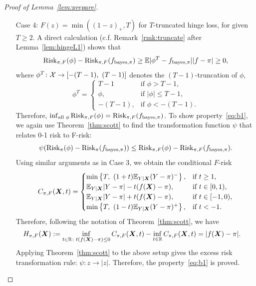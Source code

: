 \documentclass[11pt]{article}
\theoremstyle{plain}
\theoremstyle{definition}
\def\bayespif{f_{\textup{bayes},\pi}}
\def\risk{\textup{Risk}_\pi}
\def\riskF{\textup{Risk}_{\pi,F}}
\begin{document}
\begin{proof}[Proof of Lemma~\ref{lem:prepare}]
\begin{enumerate}[label={2.\arabic*},wide, labelwidth=!, labelindent=0pt]
\item[Case 4:] $F(z)=\min((1-z)_+,T)$ for $T$-truncated hinge loss, for given $T\geq 2$. 
A direct calculation (c.f. Remark~\ref{rmk:truncate} after Lemma~\ref{lem:hingeL1}) shows that
\[
\riskF(\phi)-\riskF(\bayespif)\geq \mathbb{E}|\phi^T -\bayespif||f-\pi|\geq0, 
\]
where $\phi^T\colon \mathcal{X}\to[-(T-1),\ (T-1)]$ denotes the $(T-1)$-truncation of $\phi$,
\begin{equation}\label{eq:Tphi}
\phi^T=
\begin{cases}
T-1 & \text{if }\phi>T-1,\\
\phi, & \text{if }|\phi|\leq T-1,\\
-(T-1), & \text{if }\phi<-(T-1).
\end{cases}
\end{equation}
Therefore, $\inf_{\text{all }\phi}\riskF(\phi)=\riskF(\bayespif)$. To show property~\eqref{eq:b1}, we again use Theorem~\ref{thm:scott} to find the transformation function $\psi$ that relates 0-1 risk to F-risk:
\[
\psi(\risk(\phi)-\risk(\bayespif))\leq \riskF(\phi)-\riskF(\bayespif). 
\]
Using similar arguments as in Case 3, we obtain the conditional $F$-risk
\[
C_{\pi,F}(\bm X,t)=
\begin{cases}
\min\left\{T,\ (1+t)\mathbb{E}_{Y|\bm X}(Y-\pi)^{-}\right\}, & \text{if } t\geq 1,\\
\mathbb{E}_{Y|\bm X}|Y-\pi|-t(f(\bm X)-\pi), & \text{if } t\in[0,1),\\
\mathbb{E}_{Y|\bm X}|Y-\pi|+t(f(\bm X)-\pi), & \text{if } t\in[-1,0),\\
\min\left\{T,\ (1-t)\mathbb{E}_{Y|\bm X}(Y-\pi)^{+}\right\}, & \text{if } t<-1.\\
\end{cases}
\]
Therefore, following the notation of Theorem~\ref{thm:scott}, we have
\begin{align}
H_{\pi,F}(\bm X)&:=\inf_{t\in\mathbb{R}\colon t(f(\bm X)-\pi)\leq 0}C_{\pi,F}(\bm X, t)-\inf_{t\in\mathbb{R}} C_{\pi,F}(\bm X, t) = |f(\bm X)-\pi|.
\end{align}
Applying Theorem~\ref{thm:scott} to the above setup gives the excess risk transformation rule: $\psi: z\to|z|$. Therefore, the property~\eqref{eq:b1} is proved. 


\end{enumerate}
\end{proof}
\end{document}

